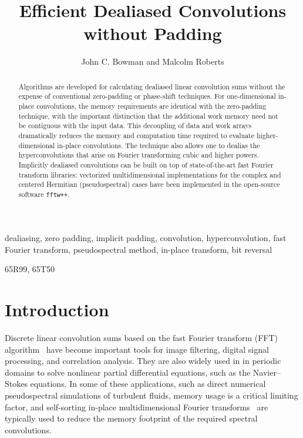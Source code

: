 \documentclass[final]{siamltex}
\begin{document}
\title{Efficient Dealiased Convolutions without Padding}
\author{John C. Bowman and Malcolm Roberts}
\maketitle

\begin{abstract}
Algorithms are developed for calculating dealiased linear convolution sums
without the expense of conventional zero-padding or phase-shift
techniques. For one-dimensional in-place convolutions, the memory
requirements are identical with the zero-padding technique, with the important
distinction that the additional work memory need not be contiguous with the
input data. This decoupling of data and work arrays dramatically reduces
the memory and computation time required to evaluate higher-dimensional
in-place convolutions. The technique also allows one to dealias the
hyperconvolutions that arise on Fourier transforming cubic and higher powers.
Implicitly dealiased convolutions can be built on top of state-of-the-art
fast Fourier transform libraries: vectorized multidimensional implementations
for the complex and centered Hermitian (pseudospectral) cases have
been implemented in the open-source software {\tt fftw++}.
\end{abstract} 

\begin{keywords} 
dealiasing, zero padding, implicit padding, convolution, hyperconvolution,
fast Fourier transform, pseudospectral method, in-place transform, bit reversal
\end{keywords}

\begin{AMS}
65R99, 65T50
\end{AMS}

\pagestyle{myheadings}



\section{Introduction}
Discrete linear convolution sums based on the fast Fourier transform
(FFT) algorithm~\cite{Gauss1866,Cooley65} have become important tools
for image filtering, digital signal processing, and correlation
analysis. They are also widely used in in periodic domains to solve
nonlinear partial differential equations, such as the Navier--Stokes
equations. In some of these applications, such as
direct numerical pseudospectral simulations of turbulent fluids,
memory usage is a critical limiting factor, and self-sorting in-place
multidimensional Fourier transforms~\cite{Temperton91} are typically used to
reduce the memory footprint of the required spectral convolutions.
\end{document}

